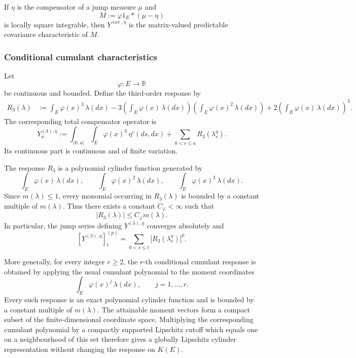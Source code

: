 \documentclass[a4paper,10pt]{article}
\begin{document}
If \(\eta\) is the compensator of a jump measure \(\mu\) and
\[
        M
        :=
        \varphi 1_E*(\mu-\eta)
\]
is locally square integrable, then
\(Y^{\operatorname{cov},\eta}\) is the matrix-valued predictable
covariance characteristic of \(M\).

\subsubsection{Conditional cumulant characteristics}

Let
\[
        \varphi:E\longrightarrow\mathbb R
\]
be continuous and bounded. Define the third-order response by
\[
\begin{aligned}
R_3(\lambda)
&:=
\int_E\varphi(x)^3\,\lambda(dx)
-
3
\left(
        \int_E\varphi(x)\,\lambda(dx)
\right)
\left(
        \int_E\varphi(x)^2\,\lambda(dx)
\right)
+
2
\left(
        \int_E\varphi(x)\,\lambda(dx)
\right)^3.
\end{aligned}
\]
The corresponding total compensator operator is
\[
        Y_u^{(3),\eta}
        :=
        \int_{(0,u]}\int_E
        \varphi(x)^3\,\eta^c(ds,dx)
        +
        \sum_{0<s\le u}R_3(\lambda_s^\eta).
\]
Its continuous part is continuous and of finite variation.

The response \(R_3\) is a polynomial cylinder function generated by
\[
        \int_E\varphi(x)\,\lambda(dx),
        \qquad
        \int_E\varphi(x)^2\,\lambda(dx),
        \qquad
        \int_E\varphi(x)^3\,\lambda(dx).
\]
Since \(m(\lambda)\le1\), every monomial occurring in
\(R_3(\lambda)\) is bounded by a constant multiple of \(m(\lambda)\).
Thus there exists a constant \(C_\varphi<\infty\) such that
\[
        |R_3(\lambda)|
        \le
        C_\varphi m(\lambda).
\]
In particular, the jump series defining \(Y^{(3),\eta}\) converges
absolutely and
\[
        [Y^{(3),\eta}]^{(p)}_t
        =
        \sum_{0<s\le t}
        |R_3(\lambda_s^\eta)|^p.
\]

More generally, for every integer \(r\ge2\), the \(r\)-th conditional
cumulant response is obtained by applying the usual cumulant polynomial
to the moment coordinates
\[
        \int_E\varphi(x)^j\,\lambda(dx),
        \qquad
        j=1,\ldots,r.
\]
Every such response is an exact polynomial cylinder function and is
bounded by a constant multiple of \(m(\lambda)\). The attainable moment vectors form a compact subset of the
finite-dimensional coordinate space. Multiplying the corresponding
cumulant polynomial by a compactly supported Lipschitz cutoff which
equals one on a neighbourhood of this set therefore gives a globally
Lipschitz cylinder representation without changing the response on
\(K(E)\).
\end{document}
